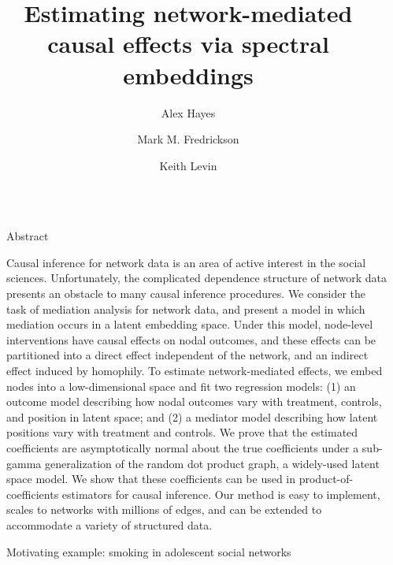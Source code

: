 \documentclass[final]{beamer}
\title{Estimating network-mediated causal effects via spectral embeddings}
\author{Alex Hayes \inst{1} \and Mark M. Fredrickson \inst{2} \and Keith Levin \inst{1}}
\institute[shortinst]{\inst{1} University of Wisconsin-Madison \samelineand \inst{2} University of Michigan}
\newlength{\sepwidth}
\newlength{\colwidth}
\newcommand{\separatorcolumn}{\begin{column}{\sepwidth}\end{column}}
\begin{document}
\begin{frame}[t]
\begin{columns}[t]
\separatorcolumn

\begin{column}{\colwidth}

  \begin{alertblock}{Abstract}

    Causal inference for network data is an area of active interest in the social sciences. Unfortunately, the complicated dependence structure of network data presents an obstacle to many causal inference procedures. We consider the task of mediation analysis for network data, and present a model in which mediation occurs in a latent embedding space. Under this model, node-level interventions have causal effects on nodal outcomes, and these effects can be partitioned into a direct effect independent of the network, and an indirect effect induced by homophily. To estimate network-mediated effects, we embed nodes into a low-dimensional space and fit two regression models: (1) an outcome model describing how nodal outcomes vary with treatment, controls, and position in latent space; and (2) a mediator model describing how latent positions vary with treatment and controls. We prove that the estimated coefficients are asymptotically normal about the true coefficients under a sub-gamma generalization of the random dot product graph, a widely-used latent space model. We show that these coefficients can be used in product-of-coefficients estimators for causal inference. Our method is easy to implement, scales to networks with millions of edges, and can be extended to accommodate a variety of structured data.

\end{alertblock}

\begin{block}{Motivating example: smoking in adolescent social networks}


\end{block}
\end{column}
\end{columns}
\end{frame}
\end{document}
